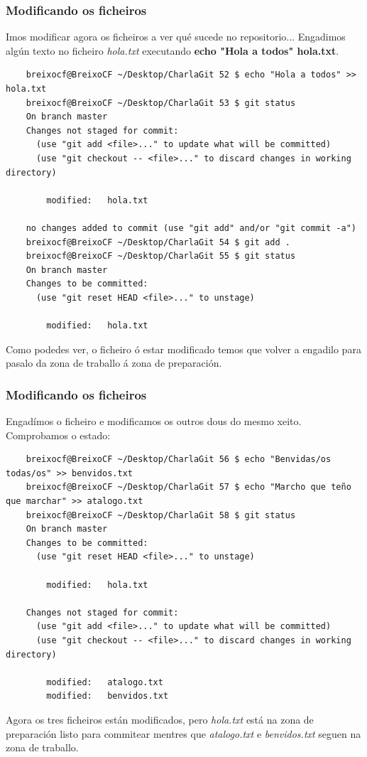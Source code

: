 \begin{frame}[fragile]
  \frametitle{Modificando os ficheiros}
  \scriptsize
  Imos modificar agora os ficheiros a ver qué sucede no repositorio... Engadimos algún texto no ficheiro \textit{hola.txt} executando \textbf{echo "Hola a todos" \guillemotright hola.txt}.
  \tiny 
\begin{verbatim}
	breixocf@BreixoCF ~/Desktop/CharlaGit 52 $ echo "Hola a todos" >> hola.txt 
	breixocf@BreixoCF ~/Desktop/CharlaGit 53 $ git status
	On branch master
	Changes not staged for commit:
	  (use "git add <file>..." to update what will be committed)
	  (use "git checkout -- <file>..." to discard changes in working directory)
	
		modified:   hola.txt
	
	no changes added to commit (use "git add" and/or "git commit -a")
	breixocf@BreixoCF ~/Desktop/CharlaGit 54 $ git add .
	breixocf@BreixoCF ~/Desktop/CharlaGit 55 $ git status
	On branch master
	Changes to be committed:
	  (use "git reset HEAD <file>..." to unstage)
	
		modified:   hola.txt
\end{verbatim}
  \scriptsize 
  Como podedes ver, o ficheiro ó estar modificado temos que volver a engadilo para pasalo da zona de traballo á zona de preparación.
\end{frame}

\begin{frame}[fragile]
  \frametitle{Modificando os ficheiros}
  \scriptsize
  Engadímos o ficheiro e modificamos os outros dous do mesmo xeito. Comprobamos o estado:
  \tiny 
\begin{verbatim}
	breixocf@BreixoCF ~/Desktop/CharlaGit 56 $ echo "Benvidas/os todas/os" >> benvidos.txt
	breixocf@BreixoCF ~/Desktop/CharlaGit 57 $ echo "Marcho que teño que marchar" >> atalogo.txt
	breixocf@BreixoCF ~/Desktop/CharlaGit 58 $ git status
	On branch master
	Changes to be committed:
	  (use "git reset HEAD <file>..." to unstage)
	
		modified:   hola.txt
	
	Changes not staged for commit:
	  (use "git add <file>..." to update what will be committed)
	  (use "git checkout -- <file>..." to discard changes in working directory)
	
		modified:   atalogo.txt
		modified:   benvidos.txt
\end{verbatim}
  \scriptsize 
  Agora os tres ficheiros están modificados, pero \textit{hola.txt} está na zona de preparación listo para commitear mentres que \textit{atalogo.txt} e \textit{benvidos.txt} seguen na zona de traballo.
\end{frame}

